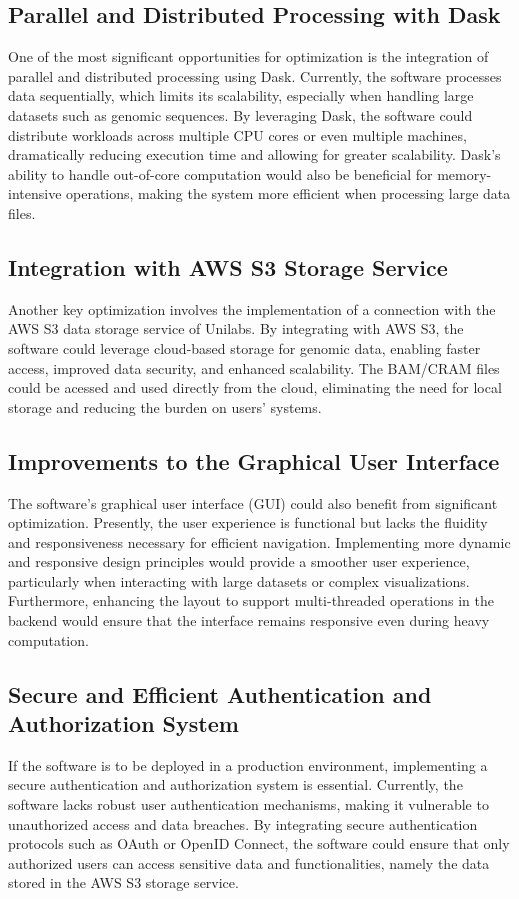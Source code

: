 \subsection{Parallel and Distributed Processing with Dask}
One of the most significant opportunities for optimization is the integration of parallel and distributed processing using Dask. Currently, the software processes data sequentially, which limits its scalability, especially when handling large datasets such as genomic sequences. By leveraging Dask, the software could distribute workloads across multiple CPU cores or even multiple machines, dramatically reducing execution time and allowing for greater scalability. Dask's ability to handle out-of-core computation would also be beneficial for memory-intensive operations, making the system more efficient when processing large data files.

\subsection{Integration with AWS S3 Storage Service}
Another key optimization involves the implementation of a connection with the AWS S3 data storage service of Unilabs. By integrating with AWS S3, the software could leverage cloud-based storage for genomic data, enabling faster access, improved data security, and enhanced scalability. The BAM/CRAM files could be acessed and used directly from the cloud, eliminating the need for local storage and reducing the burden on users' systems. 

\subsection{Improvements to the Graphical User Interface}
The software's graphical user interface (GUI) could also benefit from significant optimization. Presently, the user experience is functional but lacks the fluidity and responsiveness necessary for efficient navigation. Implementing more dynamic and responsive design principles would provide a smoother user experience, particularly when interacting with large datasets or complex visualizations. Furthermore, enhancing the layout to support multi-threaded operations in the backend would ensure that the interface remains responsive even during heavy computation.

\subsection{Secure and Efficient Authentication and Authorization System}
If the software is to be deployed in a production environment, implementing a secure authentication and authorization system is essential. Currently, the software lacks robust user authentication mechanisms, making it vulnerable to unauthorized access and data breaches. By integrating secure authentication protocols such as OAuth or OpenID Connect, the software could ensure that only authorized users can access sensitive data and functionalities, namely the data stored in the AWS S3 storage service.

